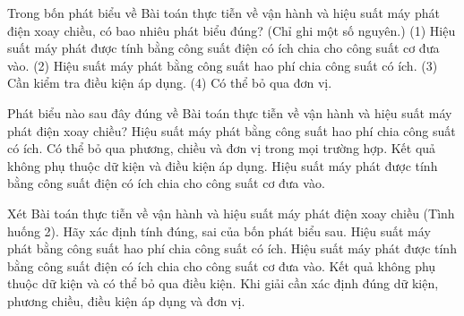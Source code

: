 \begin{ex}
Trong bốn phát biểu về Bài toán thực tiễn về vận hành và hiệu suất máy phát điện xoay chiều, có bao nhiêu phát biểu đúng? (Chỉ ghi một số nguyên.) (1) Hiệu suất máy phát được tính bằng công suất điện có ích chia cho công suất cơ đưa vào. (2) Hiệu suất máy phát bằng công suất hao phí chia công suất có ích. (3) Cần kiểm tra điều kiện áp dụng. (4) Có thể bỏ qua đơn vị.
\end{ex}

\begin{ex}
Phát biểu nào sau đây đúng về Bài toán thực tiễn về vận hành và hiệu suất máy phát điện xoay chiều?
\choice
{Hiệu suất máy phát bằng công suất hao phí chia công suất có ích.}
{Có thể bỏ qua phương, chiều và đơn vị trong mọi trường hợp.}
{Kết quả không phụ thuộc dữ kiện và điều kiện áp dụng.}
{\True Hiệu suất máy phát được tính bằng công suất điện có ích chia cho công suất cơ đưa vào.}
\end{ex}

\begin{ex}
Xét Bài toán thực tiễn về vận hành và hiệu suất máy phát điện xoay chiều (Tình huống 2). Hãy xác định tính đúng, sai của bốn phát biểu sau.
\choiceTF
{Hiệu suất máy phát bằng công suất hao phí chia công suất có ích.}
{\True Hiệu suất máy phát được tính bằng công suất điện có ích chia cho công suất cơ đưa vào.}
{Kết quả không phụ thuộc dữ kiện và có thể bỏ qua điều kiện.}
{\True Khi giải cần xác định đúng dữ kiện, phương chiều, điều kiện áp dụng và đơn vị.}
\end{ex}

